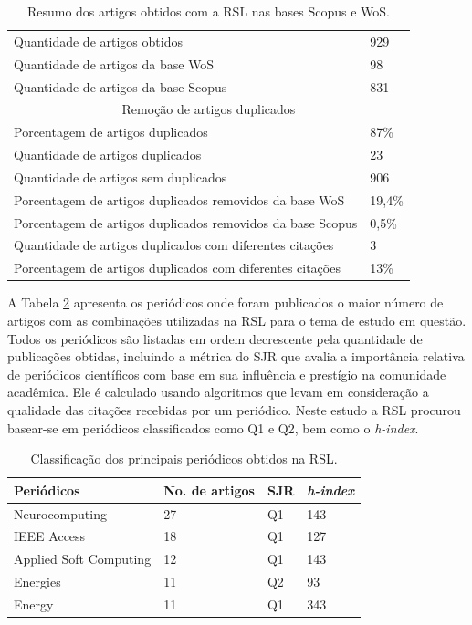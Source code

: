 \begin{table}[!htb]
	\centering
	\caption{Resumo dos artigos obtidos com a RSL nas bases Scopus e WoS.}
	\label{tab:resumo}
	\begin{tabular}{ll}
		\hline
		Quantidade de artigos obtidos & 929 \\
		Quantidade de artigos da base WoS & 98 \\
		Quantidade de artigos da base Scopus & 831 \\
		\hline
		\multicolumn{2}{c}{Remoção de artigos duplicados} \\
		\hline
		Porcentagem de artigos duplicados & 87\% \\
		Quantidade de artigos duplicados & 23 \\
		Quantidade de artigos sem duplicados & 906 \\
		Porcentagem de artigos duplicados removidos da base WoS & 19,4\% \\
		Porcentagem de artigos duplicados removidos da base Scopus & 0,5\% \\
		Quantidade de artigos duplicados com diferentes citações & 3 \\
		Porcentagem de artigos duplicados com diferentes citações & 13\% \\
		\hline
	\end{tabular}
	
\end{table}


A Tabela \ref{tb2} apresenta os periódicos onde foram publicados o maior número de artigos com as combinações utilizadas na RSL para o tema de estudo em questão. Todos os periódicos são listadas em ordem decrescente pela quantidade de publicações obtidas, incluindo a métrica do SJR que avalia a importância relativa de periódicos científicos com base em sua influência e prestígio na comunidade acadêmica. Ele é calculado usando algoritmos que levam em consideração a qualidade das citações recebidas por um periódico. Neste estudo a RSL procurou basear-se em periódicos classificados como Q1 e Q2, bem como o \textit{h-index}.

\begin{table}[!htb]
	\centering
	\caption{Classificação dos principais periódicos obtidos na RSL.}\label{tb2}
	
	\begin{tabular}{llll}		
		\toprule
		Periódicos      & No. de artigos & SJR & \textit{h-index} \\\midrule
		Neurocomputing         & 27                         & Q1                     & 143     \\
		IEEE Access            & 18                         & Q1                     & 127     \\
		Applied Soft Computing & 12                         & Q1                     & 143     \\
		Energies               & 11                         & Q2                     & 93      \\
		Energy                 & 11                         & Q1                     & 343     \\ \bottomrule
	\end{tabular}
\end{table}

